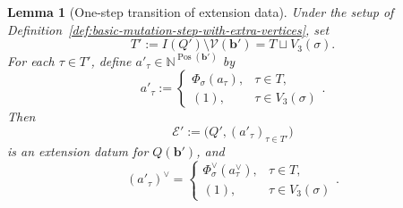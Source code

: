 \documentclass[10pt,a4paper]{article}
\newtheorem{lemma}[theorem]{Lemma}
\theoremstyle{definition}
\theoremstyle{remark}
\newcommand{\Vcal}{\mathcal V}
\begin{document}
\begin{lemma}[One-step transition of extension data]
\label{lem:basic-mutation-step-with-extra-vertices}
Under the setup of Definition~\ref{def:basic-mutation-step-with-extra-vertices},
set
\[
 T':=I(Q')\setminus\Vcal(\mathbf b')=T\sqcup V_3(\sigma).
\]
For each \(\tau\in T'\), define
\(a'_\tau\in\mathbb N^{\operatorname{Pos}(\mathbf b')}\) by
\[
 a'_\tau
 :=
 \begin{cases}
  \Phi_\sigma(a_\tau),&\tau\in T,\\
  (1),&\tau\in V_3(\sigma)
 \end{cases}.
\]
Then
\[
 \mathcal E'
 :=\bigl(Q',(a'_\tau)_{\tau\in T'}\bigr)
\]
is an extension datum for \(Q(\mathbf b')\), and
\[
 (a'_\tau)^\vee
 =
 \begin{cases}
  \Phi_\sigma^\vee(a_\tau^\vee),&\tau\in T,\\
  (1),&\tau\in V_3(\sigma)
 \end{cases}.
\]
\end{lemma}
\end{document}
